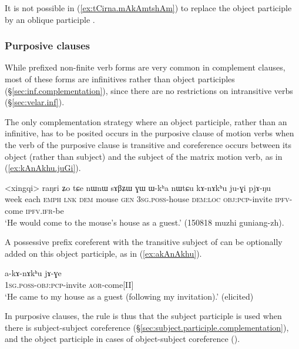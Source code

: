 It is not possible in (\ref{ex:tCirna.mAkAmtshAm}) to replace the object participle by an oblique participle .

\subsubsection{Purposive clauses} \label{sec:object.participles.complement}
While  prefixed non-finite verb forms are very common in complement clauses, most of these forms are infinitives rather than object participles (§\ref{sec:inf.complementation}), since there are no restrictions on intransitive verbs (§\ref{sec:velar.inf}).

The only complementation strategy where an object participle, rather than an infinitive, has to be posited occurs in the purposive clause of  motion verbs when the verb of the purposive clause is transitive and coreference occurs between its object (rather than subject) and the subject of the matrix motion verb, as  in (\ref{ex:kAnAkhu.juGi}).

\begin{exe}
\ex \label{ex:kAnAkhu.juGi}
\gll <xingqi> raŋri ʑo tɕe nɯnɯ sɤβʑɯ ɣɯ ɯ-kʰa nɯtɕu kɤ-nɤkʰu ju-ɣi pjɤ-ŋu  \\
week each \textsc{emph} \textsc{lnk} \textsc{dem} mouse \textsc{gen} \textsc{3sg}.\textsc{poss}-house \textsc{dem}:\textsc{loc} \textsc{obj}:\textsc{pcp}-invite \textsc{ipfv}-come \textsc{ipfv}.\textsc{ifr}-be \\
\glt `He would come to the mouse's house as a guest.' (150818 muzhi guniang-zh).
\end{exe}

 A possessive prefix coreferent with the transitive subject of  can be optionally added on this object participle, as in (\ref{ex:akAnAkhu}).

\begin{exe}
\ex \label{ex:akAnAkhu}
\gll a-kɤ-nɤkʰu jɤ-ɣe  \\
 \textsc{1sg}.\textsc{poss}-\textsc{obj}:\textsc{pcp}-invite \textsc{aor}-come[II] \\
\glt `He came to my house as a guest (following my invitation).' (elicited)
\end{exe}

In purposive clauses, the rule is thus that the subject participle is used when there is subject-subject coreference (§\ref{sec:subject.participle.complementation}), and the object participle in cases of object-subject coreference  (\citealt[248]{jacques16complementation}). 
